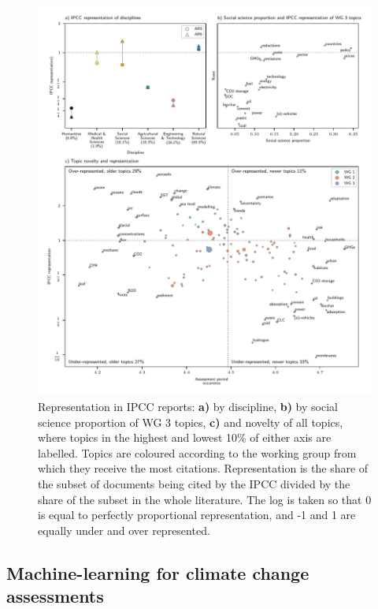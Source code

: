 \documentclass{article}
\begin{document}
\begin{linenumbers}
		\begin{figure}[htp]
			\begin{center}
				\includegraphics[width=180mm]{plots_pub/big_panel_representation.pdf}
				\caption{Representation in IPCC reports: \textbf{a)} by discipline, \textbf{b)} by social science proportion of WG 3 topics, \textbf{c)} and novelty of all topics, where topics in the highest and lowest 10\% of either axis are labelled. Topics are coloured according to the working group from which they receive the most citations. Representation is the share of the subset of documents being cited by the IPCC divided by the share of the subset in the whole literature. The log is taken so that 0 is equal to perfectly proportional representation, and -1 and 1 are equally under and over represented.}
				\label{oecd_rep}
			\end{center}
		\end{figure}
		
		
		\subsection*{Machine-learning for climate change assessments}
		

\end{linenumbers}
\end{document}
